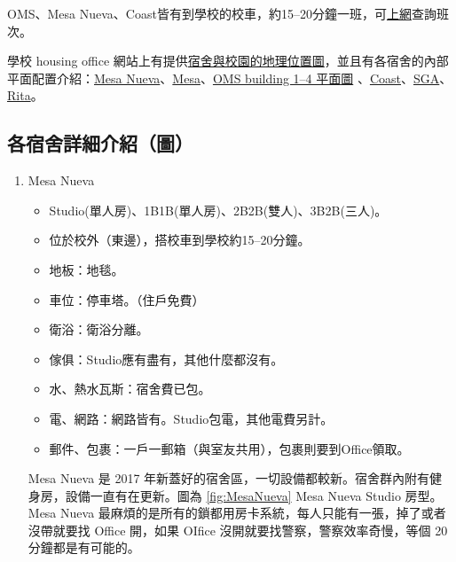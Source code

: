 \documentclass[10pt,a4paper]{book}
\begin{document}
\begin{CJK}{UTF8}{bkai}
OMS、Mesa Nueva、Coast皆有到學校的校車，約15--20分鐘一班，可\href{http://www.ucsdbus.com/}{上網}查詢班次。

學校 housing office 網站上有提供\href{http://hdh.ucsd.edu/docs/ucsdcampusmap.pdf}{宿舍與校園的地理位置圖}，並且有各宿舍的內部平面配置介紹：\href{https://hdh.ucsd.edu/arch/pages/MesaNueva.html}{Mesa Nueva}、\href{http://hdh.ucsd.edu/arch/mesa.asp}{Mesa}、\href{http://hdh.ucsd.edu/arch/onemiramar.asp}{OMS building 1--4 平面圖} 、\href{http://hdh.ucsd.edu/arch/docs/Coast_SiteMapFloorplans.pdf}{Coast}、\href{http://hdh.ucsd.edu/arch/sga.asp}{SGA}、\href{http://hdh.ucsd.edu/RAR/}{Rita}。


\subsection{各宿舍詳細介紹（圖）}
\begin{enumerate}

\item Mesa Nueva
\begin{itemize}
\item Studio(單人房)、1B1B(單人房)、2B2B(雙人)、3B2B(三人)。
\item 位於校外（東邊），搭校車到學校約15--20分鐘。
\item 地板：地毯。
\item 車位：停車塔。（住戶免費）
\item 衛浴：衛浴分離。
\item 傢俱：Studio應有盡有，其他什麼都沒有。
\item 水、熱水瓦斯：宿舍費已包。
\item 電、網路：網路皆有。Studio包電，其他電費另計。
\item 郵件、包裹：一戶一郵箱（與室友共用），包裹則要到Office領取。
\end{itemize}

Mesa Nueva 是 2017 年新蓋好的宿舍區，一切設備都較新。宿舍群內附有健身房，設備一直有在更新。圖為 \ref{fig:MesaNueva} Mesa Nueva Studio 房型。Mesa Nueva 最麻煩的是所有的鎖都用房卡系統，每人只能有一張，掉了或者沒帶就要找 Office 開，如果 OIfice 沒開就要找警察，警察效率奇慢，等個 20 分鐘都是有可能的。
\\



\end{enumerate}
\end{CJK}
\end{document}
